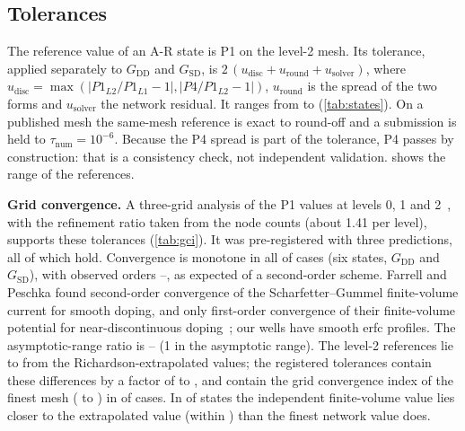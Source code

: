 \documentclass[11pt]{article}
\newcommand{\G}[1]{G_{\mathrm{#1}}}
\newcommand{\taunum}{\tau_{\mathrm{num}}}
\begin{document}
\subsection{Tolerances}
The reference value of an A-R state is P1 on the level-2 mesh. Its tolerance, applied separately to $\G{DD}$ and
$\G{SD}$, is $2\,(u_\mathrm{disc} + u_\mathrm{round} + u_\mathrm{solver})$, where
$u_\mathrm{disc} = \max(|P1_{L2}/P1_{L1} - 1|, |P4/P1_{L2} - 1|)$, $u_\mathrm{round}$ is the spread of the two forms and
$u_\mathrm{solver}$ the network residual. It ranges from \tolMin{} to \tolMax{} (\cref{tab:states}). On a published mesh
the same-mesh reference is exact to round-off and a submission is held to $\taunum = 10^{-6}$. Because the P4 spread is
part of the tolerance, P4 passes by construction: that is a consistency check, not independent validation.
 shows the range of the references.

\textbf{Grid convergence.} A three-grid analysis of the P1 values at levels 0, 1 and 2~\cite{Roache1994,Celik2008}, with
the refinement ratio taken from the node counts (about 1.41 per level), supports these tolerances (\cref{tab:gci}). It
was pre-registered with three predictions, all of which hold. Convergence is monotone in all \gciMonotone{} of
\gciPairs{} cases (six states, $\G{DD}$ and $\G{SD}$), with observed orders \gciPmin{}--\gciPmax{}, as expected of a
second-order scheme. Farrell and Peschka found second-order convergence of the Scharfetter--Gummel finite-volume current
for smooth doping, and only first-order convergence of their finite-volume potential for near-discontinuous
doping~\cite{FarrellPeschka2019}; our wells have smooth erfc profiles. The asymptotic-range ratio is \gciAsymMin{}--\gciAsymMax{} (1 in the asymptotic range). The
level-2 references lie \gciRelMin{} to \gciRelMax{} from the Richardson-extrapolated values; the registered tolerances
contain these differences by a factor of \gciTolRatioMin{} to \gciTolRatioMax{}, and contain the grid convergence index
of the finest mesh (\gciFineMin{} to \gciFineMax{}) in \gciFineWithin{} of \gciPairs{} cases. In \gciPfourCloser{} of \gciStates{} states the independent
finite-volume value lies closer to the extrapolated value (within \gciPfourMax{}) than the finest network value does.

\begin{table}[t]
\centering\small
\caption{Three-terminal reference values (body B1). A-R values are P1 at level 2, with the relative tolerance for any
mesh; HO values are the level-1 same-mesh references.}\label{tab:states}

\end{table}
\end{document}
